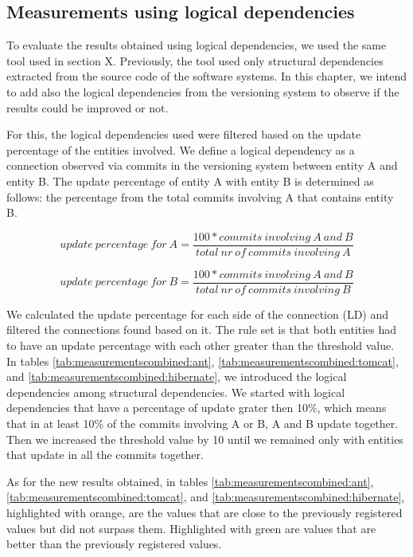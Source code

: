 \documentclass[12pt]{mitthesis}
\begin{document}
\subsection{Measurements using logical dependencies}


To evaluate the results obtained using logical dependencies, we used the same tool used in section X. 
Previously, the tool used only structural dependencies extracted from the source code of the software systems. In this chapter, we intend to add also the logical dependencies from the versioning system to observe if the results could be improved or not.

For this, the logical dependencies used were filtered based on the update percentage of the entities involved. We define a logical dependency as a connection observed via commits in the versioning system between entity A and entity B. The update percentage of entity A with entity B is determined as follows: the percentage from the total commits involving A that contains entity B.

\[ update\ percentage\ for\ A 
  = \dfrac{100 * commits\ involving\ A\ and\ B}{total\ nr\ of\ commits\ involving\ A}
\]

\[ update\ percentage\ for\ B 
  = \dfrac{100 * commits\ involving\ A\ and\ B}{total\ nr\ of\ commits\ involving\ B}
\]

We calculated the update percentage for each side of the connection (LD) and filtered the connections found based on it. The rule set is that both entities had to have an update percentage with each other greater than the threshold value.
In tables \ref{tab:measurementscombined:ant}, \ref{tab:measurementscombined:tomcat}, and \ref{tab:measurementscombined:hibernate}, we introduced the logical dependencies among structural dependencies. We started with logical dependencies that have a percentage of update grater then 10\%, which means that in at least 10\% of the commits involving A or B, A and B update together. Then we increased the threshold value by 10 until we remained only with entities that update in all the commits together.

As for the new results obtained, in tables \ref{tab:measurementscombined:ant}, \ref{tab:measurementscombined:tomcat}, and \ref{tab:measurementscombined:hibernate}, highlighted with orange, are the values that are close to the previously registered values but did not surpass them. Highlighted with green are values that are better than the previously registered values.
\end{document}
